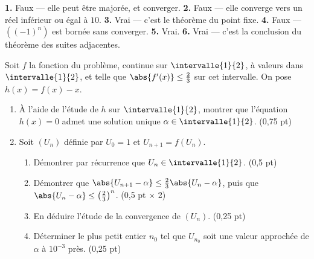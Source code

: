 \begin{corrige}[je me teste]
\textbf{1.} Faux — elle peut être majorée, et converger.
\textbf{2.} Faux — elle converge vers un réel inférieur ou égal à $10$.
\textbf{3.} Vrai — c'est le théorème du point fixe.
\textbf{4.} Faux — $\left((-1)^{n}\right)$ est bornée sans converger.
\textbf{5.} Vrai.
\textbf{6.} Vrai — c'est la conclusion du théorème des suites adjacentes.
\end{corrige}

\begin{commeaubac}
Soit $f$ la fonction du problème, continue sur $\intervalle{1}{2}$, à valeurs
dans $\intervalle{1}{2}$, et telle que $\abs{f'(x)} \leq \frac23$ sur cet
intervalle. On pose $h(x) = f(x)-x$.

\begin{enumerate}[label=\textbf{\arabic*.}, leftmargin=*, itemsep=0.25em]
  \item À l'aide de l'étude de $h$ sur $\intervalle{1}{2}$, montrer que
        l'équation $h(x) = 0$ admet une solution unique
        $\alpha \in \intervalle{1}{2}$. \hfill\textup{(0,75 pt)}
  \item Soit $(U_{n})$ définie par $U_{0} = 1$ et $U_{n+1} = f(U_{n})$.
        \begin{enumerate}[label=\textbf{\alph*)}, leftmargin=1.4em]
          \item Démontrer par récurrence que $U_{n} \in \intervalle{1}{2}$.
                \hfill\textup{(0,5 pt)}
          \item Démontrer que
                $\abs{U_{n+1}-\alpha} \leq \frac23\abs{U_{n}-\alpha}$, puis
                que $\abs{U_{n}-\alpha} \leq \left(\frac23\right)^{n}$.
                \hfill\textup{(0,5 pt $\times$ 2)}
          \item En déduire l'étude de la convergence de $(U_{n})$.
                \hfill\textup{(0,25 pt)}
          \item Déterminer le plus petit entier $n_{0}$ tel que $U_{n_{0}}$
                soit une valeur approchée de $\alpha$ à $10^{-3}$ près.
                \hfill\textup{(0,25 pt)}
        \end{enumerate}
\end{enumerate}
\end{commeaubac}


